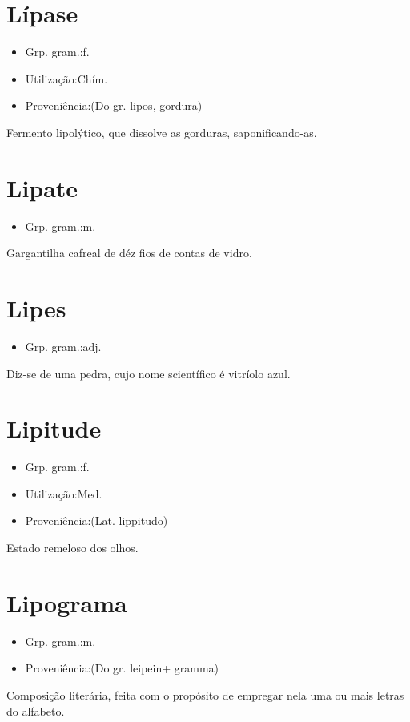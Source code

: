 \section{Lípase}
\begin{itemize}
\item {Grp. gram.:f.}
\end{itemize}
\begin{itemize}
\item {Utilização:Chím.}
\end{itemize}
\begin{itemize}
\item {Proveniência:(Do gr. \textunderscore lipos\textunderscore , gordura)}
\end{itemize}
Fermento lipolýtico, que dissolve as gorduras, saponificando-as.
\section{Lipate}
\begin{itemize}
\item {Grp. gram.:m.}
\end{itemize}
Gargantilha cafreal de déz fios de contas de vidro.
\section{Lipes}
\begin{itemize}
\item {Grp. gram.:adj.}
\end{itemize}
Diz-se de uma pedra, cujo nome scientífico é vitríolo azul.
\section{Lipitude}
\begin{itemize}
\item {Grp. gram.:f.}
\end{itemize}
\begin{itemize}
\item {Utilização:Med.}
\end{itemize}
\begin{itemize}
\item {Proveniência:(Lat. \textunderscore lippitudo\textunderscore )}
\end{itemize}
Estado remeloso dos olhos.
\section{Lipograma}
\begin{itemize}
\item {Grp. gram.:m.}
\end{itemize}
\begin{itemize}
\item {Proveniência:(Do gr. \textunderscore leipein\textunderscore  + \textunderscore gramma\textunderscore )}
\end{itemize}
Composição literária, feita com o propósito de empregar nela uma ou mais letras do alfabeto.
